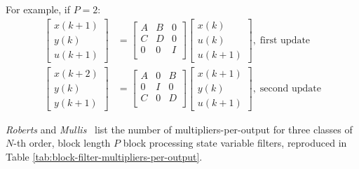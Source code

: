 \documentclass[a4paper,twoside,10pt,english]{report}
\begin{document}
For example, if $P=2$:
\begin{align}
\label{eq:block-2-state-variable}
\left[ \begin{array}{c} 
x \left( k + 1 \right) \\
y \left( k \right) \\
u \left( k+1 \right)
\end{array} \right]
 &= 
\left[ \begin{array}{ccc}
A & B & 0\\ 
C & D & 0\\
0 & 0 & I\\
\end{array}\right]
\left[ \begin{array}{c}
x \left( k \right) \\
u \left( k \right) \\
u \left( k+1 \right)
\end{array}\right],\;\text{first update}\\
\left[ \begin{array}{c} 
x \left( k + 2 \right) \\
y \left( k \right) \\
y \left( k+1 \right)
\end{array} \right]
 &= 
\left[ \begin{array}{ccc}
A & 0 & B\\ 
0 & I & 0\\
C & 0 & D\\
\end{array}\right]
\left[ \begin{array}{c}
x \left( k+1 \right)\\
y \left( k \right) \\
u \left( k+1 \right)
\end{array}\right],\;\text{second update}
\end{align}

\emph{Roberts} and
\emph{Mullis}~\cite[Table 10.2.1]{RobertsMullis_DigitalSignalProcessing}
list the number of multipliers-per-output for three classes of $N$-th order,
block length $P$ block processing state variable filters, reproduced in Table 
\ref{tab:block-filter-multipliers-per-output}.
\end{document}
